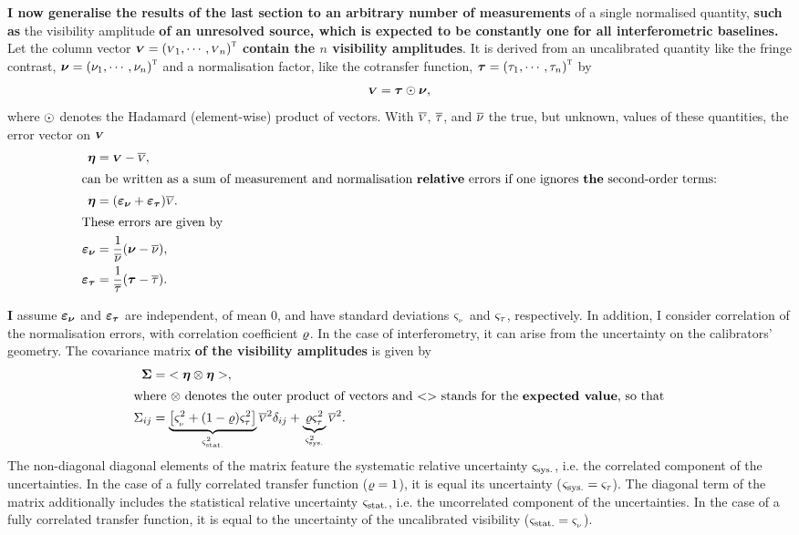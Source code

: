 \documentclass{pasa}
\def\correction#1{{\bfseries #1}}
\begin{document}
\correction{I now generalise the results of the last section to an arbitrary number of measurements} of a single normalised quantity, \correction{such as} the visibility amplitude \correction{of an unresolved source, which is expected to be constantly one for all interferometric baselines.} Let the column vector $\boldsymbol{{\scriptstyle V}} = {({\scriptstyle V}_1, \cdots, {\scriptstyle V}_n)}^\text{\textsc{t}}$ \correction{contain the $n$ visibility amplitudes}. It is derived from an uncalibrated quantity like the fringe contrast, $\boldsymbol{\nu} = {(\nu_1, \cdots, \nu_n)}^\text{\textsc{t}}$ and a normalisation factor, like the cotransfer function, $\boldsymbol{\tau} = {(\tau_1, \cdots, \tau_n)}^\text{\textsc{t}}$ by 
\begin{equation}
    \boldsymbol{{\scriptstyle V}} = \boldsymbol{\tau}\odot\boldsymbol{\nu},
\end{equation}
where $\odot$ denotes the Hadamard (element-wise) product of vectors. With $\overline{{\scriptstyle V}}$, $\overline{\tau}$, and $\overline{\nu}$ the true, but unknown, values of these quantities, the error vector on $\boldsymbol{{\scriptstyle V}}$  
\begin{align}
    \verror    &= \vdata - \datamean, \\
\intertext{can be written as a sum of measurement and normalisation \correction{relative} errors if one ignores \correction{the} second-order terms:}
    \verror    &= (\vrawerror + \vrelerror) \datamean.\\
\intertext{These errors are given by}
    \vrawerror &= \frac1\rawmean (\vraw - \rawmean), \\
    \vrelerror &= \frac1\cotmean (\vcot-\cotmean).
\end{align}

\correction{I} assume $\boldsymbol{\varepsilon_\nu}$ and $\boldsymbol{\varepsilon_\tau}$ are independent, of mean 0, and have standard deviations $\varsigma_{_\nu}$ and $\varsigma_\tau$, respectively. In addition, I consider correlation of the normalisation errors, with correlation coefficient $\varrho$.  In the case of interferometry, it can arise from the uncertainty on the calibrators' geometry.  The covariance matrix \correction{of the visibility amplitudes} is given by
\begin{align}
    \vcov     &= \expect{\verror\outer\verror},\\
\intertext{where $\outer$ denotes the outer product of vectors and $\expect{}$ stands for the \correction{expected value}, so that}
    \cov_{ij} &= \underbrace{\left[ \rawdev^2 
                  + (1-\corr)\reldev^2 \right]}_{\stadev^2} \datamean^2
                \delta_{ij} 
            + \underbrace{\corr\reldev^2}_{\sysdev^2} \datamean^2.
\end{align}
The non-diagonal diagonal elements of the matrix feature the systematic
relative uncertainty $\varsigma_\text{sys.}$, i.e. the correlated component of the
uncertainties.  In the case of a fully correlated transfer function ($\varrho =
1$), it is equal its uncertainty ($\varsigma_\text{sys.} = \varsigma_\tau$). The diagonal term of
the matrix additionally includes the statistical relative uncertainty
$\varsigma_\text{stat.}$, i.e. the uncorrelated component of the uncertainties.  In the case
of a fully correlated transfer function, it is equal to the uncertainty of the
uncalibrated visibility ($\varsigma_\text{stat.} = \varsigma_{_\nu}$).
\end{document}
